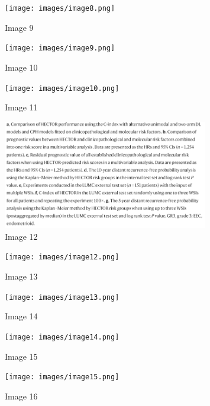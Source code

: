 \documentclass{article}%
\begin{document}
%


\begin{figure}[h!]%
\centering%
\texttt{[image: images/image8.png]}%
\caption{Image 9}%
\end{figure}

%


\begin{figure}[h!]%
\centering%
\texttt{[image: images/image9.png]}%
\caption{Image 10}%
\end{figure}

%


\begin{figure}[h!]%
\centering%
\texttt{[image: images/image10.png]}%
\caption{Image 11}%
\end{figure}

%


\begin{figure}[h!]%
\centering%
\includegraphics[width=0.8\textwidth]{images/image11.png}%
\caption{Image 12}%
\end{figure}

%


\begin{figure}[h!]%
\centering%
\texttt{[image: images/image12.png]}%
\caption{Image 13}%
\end{figure}

%


\begin{figure}[h!]%
\centering%
\texttt{[image: images/image13.png]}%
\caption{Image 14}%
\end{figure}

%


\begin{figure}[h!]%
\centering%
\texttt{[image: images/image14.png]}%
\caption{Image 15}%
\end{figure}

%


\begin{figure}[h!]%
\centering%
\texttt{[image: images/image15.png]}%
\caption{Image 16}%
\end{figure}
\end{document}
